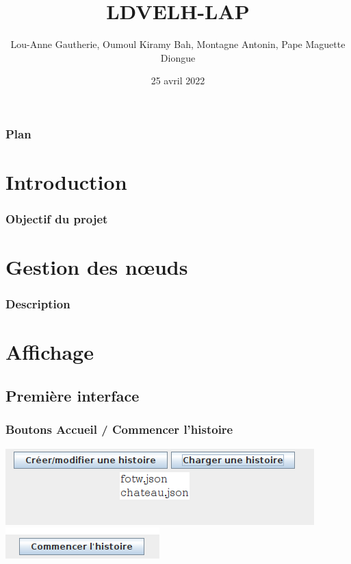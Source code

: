 \documentclass{beamer}
\title{LDVELH-LAP}
\date{25 avril 2022}
\author{Lou-Anne Gautherie, Oumoul Kiramy Bah, Montagne Antonin, Pape Maguette Diongue}
\institute{Université de Caen Normandie}
\begin{document}
\maketitle

\begin{frame} 
\frametitle{Plan}
\tableofcontents
\end{frame}
\section{Introduction}
\begin{frame}
\frametitle{Objectif du projet}

\end{frame}
\section{Gestion des nœuds}
\begin{frame}
\frametitle{Description}

\end{frame}
\section{Affichage}
\subsection{Première interface}%
\begin{frame}
\frametitle{Boutons Accueil / Commencer l'histoire}

\begin{center}
\includegraphics[scale=0.5]{./images/charger.png}\\
\includegraphics[scale=0.5]{./images/commencer.png}
\end{center}

\end{frame}
\end{document}
